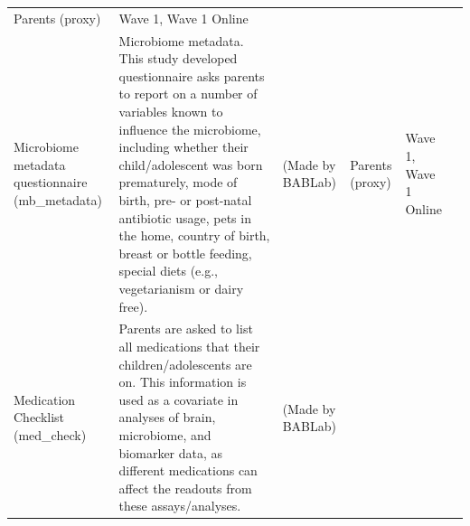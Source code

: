 \documentclass[]{book}
\begin{document}
\begin{longtable}[]{@{}llllll@{}}
\begin{minipage}[t]{0.16\columnwidth}
Parents (proxy)\strut
\end{minipage} & \begin{minipage}[t]{0.06\columnwidth}\raggedright
Wave 1, Wave 1 Online\strut
\end{minipage} & \begin{minipage}[t]{0.10\columnwidth}\raggedright
\strut
\end{minipage}\tabularnewline
\begin{minipage}[t]{0.18\columnwidth}\raggedright
Microbiome metadata questionnaire (mb\_metadata)\strut
\end{minipage} & \begin{minipage}[t]{0.18\columnwidth}\raggedright
Microbiome metadata. This study developed questionnaire asks parents to report on a number of variables known to influence the microbiome, including whether their child/adolescent was born prematurely, mode of birth, pre- or post-natal antibiotic usage, pets in the home, country of birth, breast or bottle feeding, special diets (e.g., vegetarianism or dairy free).\strut
\end{minipage} & \begin{minipage}[t]{0.15\columnwidth}\raggedright
(Made by BABLab)\strut
\end{minipage} & \begin{minipage}[t]{0.16\columnwidth}\raggedright
Parents (proxy)\strut
\end{minipage} & \begin{minipage}[t]{0.06\columnwidth}\raggedright
Wave 1, Wave 1 Online\strut
\end{minipage} & \begin{minipage}[t]{0.10\columnwidth}\raggedright
\strut
\end{minipage}\tabularnewline
\begin{minipage}[t]{0.18\columnwidth}\raggedright
Medication Checklist (med\_check)\strut
\end{minipage} & \begin{minipage}[t]{0.18\columnwidth}\raggedright
Parents are asked to list all medications that their children/adolescents are on. This information is used as a covariate in analyses of brain, microbiome, and biomarker data, as different medications can affect the readouts from these assays/analyses.\strut
\end{minipage} & \begin{minipage}[t]{0.15\columnwidth}\raggedright
(Made by BABLab)\strut
\end{minipage} & \begin{minipage}[t]{0.16\columnwidth}\raggedright

\end{minipage}
\end{longtable}
\end{document}
